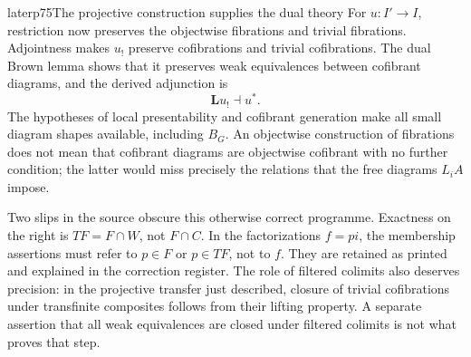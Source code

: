 \begin{dcomment}{later}{p75}{The projective construction supplies the dual theory}
For $u:I'\to I$, restriction now preserves the objectwise fibrations and trivial fibrations. Adjointness makes $u_!$ preserve cofibrations and trivial cofibrations. The dual Brown lemma shows that it preserves weak equivalences between cofibrant diagrams, and the derived adjunction is
\[
                              \mathbf Lu_!\dashv u^*.
\]
The hypotheses of local presentability and cofibrant generation make all small diagram shapes available, including $B_G$. An objectwise construction of fibrations does not mean that cofibrant diagrams are objectwise cofibrant with no further condition; the latter would miss precisely the relations that the free diagrams $L_iA$ impose.

Two slips in the source obscure this otherwise correct programme. Exactness on the right is $TF=F\cap W$, not $F\cap C$. In the factorizations $f=pi$, the membership assertions must refer to $p\in F$ or $p\in TF$, not to $f$. They are retained as printed and explained in the correction register. The role of filtered colimits also deserves precision: in the projective transfer just described, closure of trivial cofibrations under transfinite composites follows from their lifting property. A separate assertion that all weak equivalences are closed under filtered colimits is not what proves that step.
\end{dcomment}



